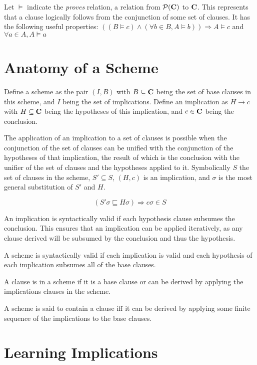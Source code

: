 \documentclass{article}
\newcommand{\allclauses}[0]{{\bf C}}
\newcommand{\powerset}[1]{{\mathcal{P}(#1)}}
\begin{document}
Let $\models$ indicate the {\it proves} relation, a relation from $\powerset{\allclauses}$ to $\allclauses$.
This represents that a clause logically follows from the conjunction of some set of clauses.
It has the following useful properties:
  $ ((B \models c) \land (\forall b \in B, A \models b)) \Rightarrow A \models c  $ and 
  $ \forall a \in A , A \models a$

\section{Anatomy of a Scheme}

Define a scheme as the pair $(I, B)$ with $B \subseteq \allclauses$ being the set of base clauses in this scheme, and $I$ being the set of implications. Define an implication as $H \rightarrow c$ with $H \subseteq \allclauses$ being the hypotheses of this implication, and $c \in \allclauses$ being the conclusion.

The application of an implication to a set of clauses is possible when the conjunction of the set of clauses can be unified with the conjunction of the hypotheses of that implication,
the result of which is the conclusion with the unifier of the set of clauses and the hypotheses applied to it. Symbolically
 $S$ the set of clauses in the scheme, $S' \subseteq S$, $(H,c)$ is an implication, and $\sigma$ is the most general substitution of $S'$ and $H$.

\begin{equation}
  (S' \sigma \sqsubseteq H \sigma) \Rightarrow c \sigma \in S
\end{equation}


An implication is syntactically valid if each hypothesis clause subsumes the conclusion.
This ensures that an implication can be applied iteratively, as any clause derived will be subsumed by the conclusion and thus the hypothesis.


A scheme is syntactically valid if each implication is valid and
each hypothesis of each implication subsumes all of the base clauses.

A clause is in a scheme if it is a base clause or can be derived by applying the implications clauses in the scheme.

A scheme is said to contain a clause iff it can be derived by applying some finite sequence of the 
implications to the base clauses.

\section{Learning Implications}
\end{document}
